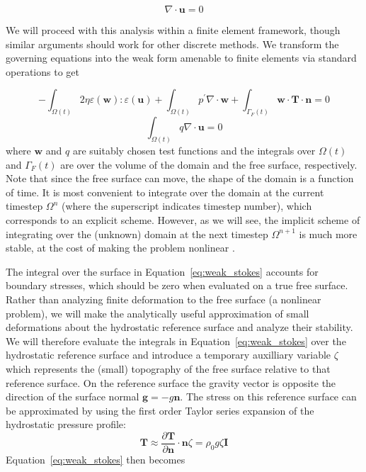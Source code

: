 \documentclass[preprint,12pt,authoryear]{elsarticle}
\begin{document}
\begin{equation}
\nabla \cdot \mathbf{u} = 0
\label{eq:incompressible}
\end{equation}

We will proceed with this analysis within a finite element framework, though similar arguments should 
work for other discrete methods.
We transform the governing equations into the weak form amenable to finite elements via standard operations \citep[e.g.][]{zienkiewicz1977finite} to get

\begin{equation}
-\int_{\Omega(t)} 2 \eta \varepsilon( \mathbf{w} ) \colon \varepsilon( \mathbf{u} ) + \int_{\Omega(t)} p^\prime \nabla \cdot \mathbf{w} 
+ \int_{\Gamma_F(t)} \mathbf{w} \cdot \mathbf{T} \cdot \mathbf{n} = 0 
\label{eq:weak_stokes}
\end{equation}
\begin{equation}
\int_{\Omega(t)} q \nabla \cdot \mathbf{u} = 0
\label{eq:weak_incompressible}
\end{equation}
where $\mathbf{w}$ and $q$ are suitably chosen test functions and the integrals over 
$\Omega(t)$ and $\Gamma_F(t)$ are over the volume of the domain and the free surface, respectively.
Note that since the free surface can move, the shape of the domain is a function of time.
It is most convenient to integrate over the domain at the current timestep $\Omega^n$ 
(where the superscript indicates timestep number), which corresponds to an explicit scheme.
However, as we will see, the implicit scheme of integrating over the (unknown) domain at the next timestep $\Omega^{n+1}$
is much more stable, at the cost of making the problem nonlinear \citep{furuichi2015implicit}.

The integral over the surface in Equation~\eqref{eq:weak_stokes} accounts for boundary stresses, 
which should be zero when evaluated on a true free surface.
Rather than analyzing finite deformation to the free surface (a nonlinear problem),
we will make the analytically useful approximation of small deformations about the hydrostatic 
reference surface and analyze their stability.
We will therefore  evaluate the integrals in Equation~\eqref{eq:weak_stokes} 
over the hydrostatic reference surface and introduce a temporary auxilliary variable $\zeta$ which 
represents the (small) topography of the free surface relative to that reference surface.
On the reference surface the gravity vector is opposite the direction of the surface normal $\mathbf{g} = -g \mathbf{n}$.
The stress on this reference surface can be approximated by using the first order Taylor series
expansion of the hydrostatic pressure profile:
\begin{equation}
\mathbf{T} \approx \frac{\partial \mathbf{T}}{\partial \mathbf{n} } \cdot \mathbf{n} \zeta = \rho_0 g \zeta \mathbf{I}
\label{eq:hydrostatic}
\end{equation}
Equation~\eqref{eq:weak_stokes} then becomes
\end{document}
